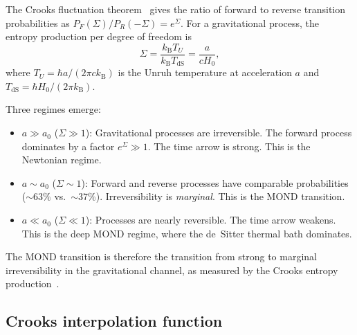 \documentclass[prd,twocolumn,superscriptaddress,longbibliography,floatfix]{revtex4-2}
\newcommand{\kB}{k_{\mathrm{B}}}
\begin{document}
The Crooks fluctuation theorem~\cite{Crooks1999,Kwon2019}
gives the ratio of forward to reverse transition probabilities
as $P_F(\Sigma)/P_R(-\Sigma) = e^\Sigma$.  For a gravitational
process, the entropy production per degree of freedom is
\begin{equation}
\Sigma = \frac{\kB T_U}{\kB T_{\mathrm{dS}}} =
\frac{a}{cH_0},
\label{eq:sigma_a}
\end{equation}
where $T_U = \hbar a/(2\pi c \kB)$ is the Unruh temperature
at acceleration $a$ and
$T_{\mathrm{dS}} = \hbar H_0/(2\pi \kB)$.

Three regimes emerge:
\begin{itemize}
\item $a \gg a_0$ ($\Sigma \gg 1$):
Gravitational processes are irreversible.
The forward process dominates by a factor $e^\Sigma \gg 1$.
The time arrow is strong.  This is the Newtonian regime.

\item $a \sim a_0$ ($\Sigma \sim 1$):
Forward and reverse processes have comparable probabilities
($\sim\!63\%$ vs.\ $\sim\!37\%$).  Irreversibility is
\emph{marginal}.  This is the MOND transition.

\item $a \ll a_0$ ($\Sigma \ll 1$):
Processes are nearly reversible.
The time arrow weakens.  This is the deep MOND regime,
where the de~Sitter thermal bath dominates.
\end{itemize}

The MOND transition is therefore the transition from
strong to marginal irreversibility in the gravitational
channel, as measured by the Crooks entropy
production~\cite{BassoCeleri2025}.

\subsection{Crooks interpolation function}
\end{document}
